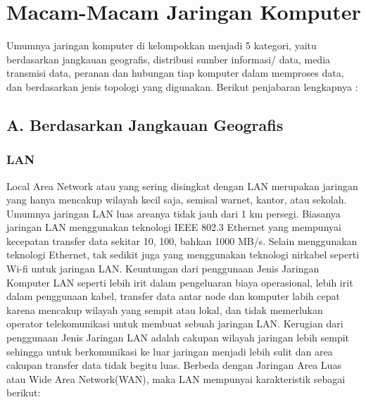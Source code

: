 \section{Macam-Macam Jaringan Komputer}
  Umumnya jaringan komputer di kelompokkan menjadi 5 kategori, yaitu berdasarkan jangkauan geografis, distribusi sumber informasi/ data, media transmisi data, peranan dan hubungan tiap komputer dalam memproses data, dan berdasarkan jenis topologi yang digunakan. Berikut penjabaran lengkapnya :
  \subsection{A. Berdasarkan Jangkauan Geografis}
    \subsubsection{LAN}
      Local Area Network atau yang sering disingkat dengan LAN merupakan jaringan yang hanya mencakup wilayah kecil saja, semisal warnet, kantor, atau sekolah. Umumnya jaringan LAN luas areanya tidak jauh dari 1 km persegi.
    Biasanya jaringan LAN menggunakan teknologi IEEE 802.3 Ethernet yang mempunyai kecepatan transfer data sekitar 10, 100, bahkan 1000 MB/s. Selain menggunakan teknologi Ethernet, tak sedikit juga yang menggunakan teknologi nirkabel seperti Wi-fi untuk jaringan LAN.
    Keuntungan dari penggunaan Jenis Jaringan Komputer LAN seperti lebih irit dalam pengeluaran biaya operasional, lebih irit dalam penggunaan kabel, transfer data antar node dan komputer labih cepat karena mencakup wilayah yang sempit atau lokal, dan tidak memerlukan operator telekomunikasi untuk membuat sebuah jaringan LAN.
    Kerugian dari penggunaan Jenis Jaringan LAN adalah cakupan wilayah jaringan lebih sempit sehingga untuk berkomunikasi ke luar jaringan menjadi lebih sulit dan area cakupan transfer data tidak begitu luas.
    Berbeda dengan Jaringan Area Luas atau Wide Area Network(WAN), maka LAN mempunyai karakteristik sebagai berikut:
